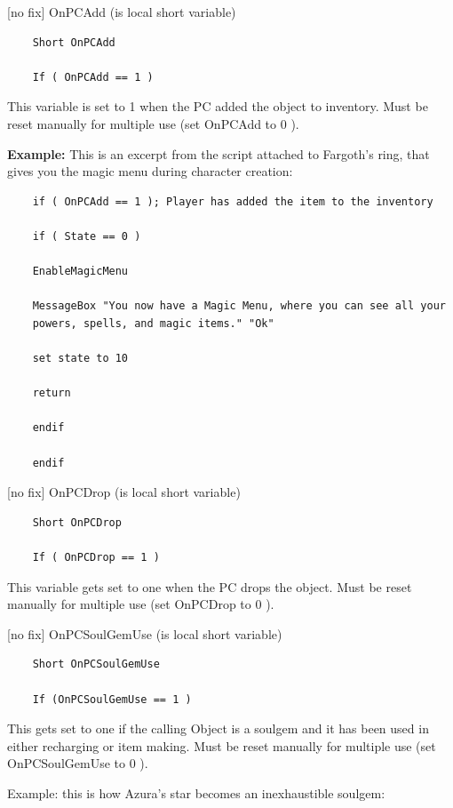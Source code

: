	{[}no fix{]} OnPCAdd (is local short variable)

\begin{lstlisting}	
	Short OnPCAdd
	
	If ( OnPCAdd == 1 )
\end{lstlisting}

This variable is set to 1 when the PC added the object to inventory.
Must be reset manually for multiple use (set OnPCAdd to 0 ).

\textbf{Example:} This is an excerpt from the script attached to
Fargoth's ring, that gives you the magic menu during character creation:

\begin{lstlisting}
	if ( OnPCAdd == 1 ); Player has added the item to the inventory
	
	if ( State == 0 )
	
	EnableMagicMenu
	
	MessageBox "You now have a Magic Menu, where you can see all your
	powers, spells, and magic items." "Ok"
	
	set state to 10
	
	return
	
	endif
	
	endif
\end{lstlisting}
	
{[}no fix{]} OnPCDrop (is local short variable)

\begin{lstlisting}	
	Short OnPCDrop
	
	If ( OnPCDrop == 1 )
\end{lstlisting}

This variable gets set to one when the PC drops the object. Must be
reset manually for multiple use (set OnPCDrop to 0 ).

{[}no fix{]} OnPCSoulGemUse (is local short variable)

\begin{lstlisting}	
	Short OnPCSoulGemUse
	
	If (OnPCSoulGemUse == 1 )
\end{lstlisting}

This gets set to one if the calling Object is a soulgem and it has been
used in either recharging or item making. Must be reset manually for
multiple use (set OnPCSoulGemUse to 0 ).

Example: this is how Azura's star becomes an inexhaustible soulgem:



